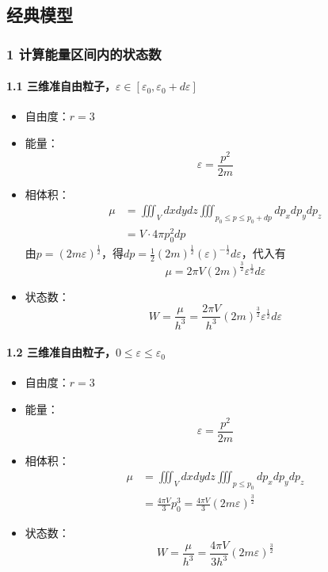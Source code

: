 \documentclass[UTF8,twocolumn]{ctexart}
\providecommand{\tightlist}{%
  \setlength{\itemsep}{0pt}\setlength{\parskip}{0pt}}
\let\oldparagraph\paragraph
\renewcommand{\paragraph}[1]{\oldparagraph{#1}\mbox{}}
\begin{document}
\subsection{经典模型}\label{ux7ecfux5178ux6a21ux578b}

\subsubsection{1
计算能量区间内的状态数}\label{ux8ba1ux7b97ux80fdux91cfux533aux95f4ux5185ux7684ux72b6ux6001ux6570}

\paragraph{\texorpdfstring{1.1
三维准自由粒子，\(\varepsilon\in[\varepsilon_0,\varepsilon_0+d\varepsilon]\)}{1.1 三维准自由粒子，\textbackslash{}varepsilon\textbackslash{}in{[}\textbackslash{}varepsilon\_0,\textbackslash{}varepsilon\_0+d\textbackslash{}varepsilon{]}}}\label{ux4e09ux7ef4ux51c6ux81eaux7531ux7c92ux5b50varepsiloninvarepsilon_0varepsilon_0dvarepsilon}

\begin{itemize}
\tightlist
\item
  自由度：\(r=3\)
\item
  能量： \[\varepsilon=\frac{p^2}{2m}\]
\item
  相体积： \[\begin{aligned}
  \mu&=\iiint_Vdxdydz\iiint_{p_0\leq p\leq p_0+dp}dp_xdp_ydp_z\\
  &=V\cdot4\pi p_0^2dp
  \end{aligned}\]
  由\(p=(2m\varepsilon)^{\frac{1}{2}}\)，得\(dp=\frac{1}{2}(2m)^{\frac{1}{2}}(\varepsilon)^{-\frac{1}{2}}d\varepsilon\)，代入有
  \[\mu=2\pi V(2m)^{\frac{3}{2}}\varepsilon^{\frac{1}{2}}d\varepsilon\]
\item
  状态数：
  \[W=\frac{\mu}{h^3}=\frac{2\pi V}{h^3}(2m)^{\frac{3}{2}}\varepsilon^{\frac{1}{2}}d\varepsilon\]
\end{itemize}

\paragraph{\texorpdfstring{1.2
三维准自由粒子，\(0\leq\varepsilon\leq\varepsilon_0\)}{1.2 三维准自由粒子，0\textbackslash{}leq\textbackslash{}varepsilon\textbackslash{}leq\textbackslash{}varepsilon\_0}}\label{ux4e09ux7ef4ux51c6ux81eaux7531ux7c92ux5b500leqvarepsilonleqvarepsilon_0}

\begin{itemize}
\tightlist
\item
  自由度：\(r=3\)
\item
  能量： \[\varepsilon=\frac{p^2}{2m}\]
\item
  相体积： \[\begin{aligned}
  \mu&=\iiint_Vdxdydz\iiint_{p\leq p_0}dp_xdp_ydp_z\\
  &=\frac{4\pi V}{3}p_0^3=\frac{4\pi V}{3}(2m\varepsilon)^{\frac{3}{2}}
  \end{aligned}\]
\item
  状态数：
  \[W=\frac{\mu}{h^3}=\frac{4\pi V}{3h^3}(2m\varepsilon)^{\frac{3}{2}}\]
\end{itemize}
\end{document}
